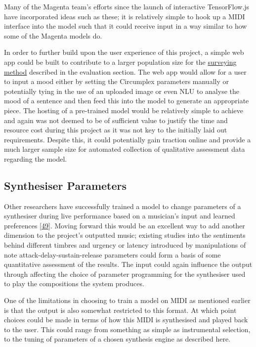 \documentclass[12pt,]{article}
\begin{document}
Many of the Magenta team's efforts since the launch of interactive
TensorFlow.js have incorporated ideas such as these; it is relatively
simple to hook up a MIDI interface into the model such that it could
receive input in a way similar to how some of the Magenta models do.

In order to further build upon the user experience of this project, a
simple web app could be built to contribute to a larger population size
for the \protect\hyperlink{qualitativesurveryingmethod}{surveying
method} described in the evaluation section. The web app would allow for
a user to input a mood either by setting the Circumplex parameters
manually or potentially tying in the use of an uploaded image or even
NLU to analyse the mood of a sentence and then feed this into the model
to generate an appropriate piece. The hosting of a pre-trained model
would be relatively simple to achieve and again was not deemed to be of
sufficient value to justify the time and resource cost during this
project as it was not key to the initially laid out requirements.
Despite this, it could potentially gain traction online and provide a
much larger sample size for automated collection of qualitative
assessment data regarding the model.

\hypertarget{synthesiser-parameters}{%
\subsection{Synthesiser Parameters}\label{synthesiser-parameters}}

Other researchers have successfully trained a model to change parameters
of a synthesiser during live performance based on a musician's input and
learned preferences {[}\protect\hyperlink{ref-sommer2014towards}{49}{]}.
Moving forward this would be an excellent way to add another dimension
to the project's outputted music; existing studies into the sentiments
behind different timbres and urgency or latency introduced by
manipulations of note attack-delay-sustain-release parameters could form
a basis of some quantitative assessment of the results. The input could
again influence the output through affecting the choice of parameter
programming for the synthesiser used to play the compositions the system
produces.

One of the limitations in choosing to train a model on MIDI as mentioned
earlier is that the output is also somewhat restricted to this format.
At which point choices could be made in terms of how this MIDI is
synthesised and played back to the user. This could range from something
as simple as instrumental selection, to the tuning of parameters of a
chosen synthesis engine as described here.
\end{document}
